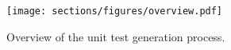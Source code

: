 \begin{figure}[t]
     \centering
     \texttt{[image: sections/figures/overview.pdf]}
    \caption{Overview of the unit test generation process.}
    \label{fig: overview}
    \vspace{-10pt}
\end{figure}